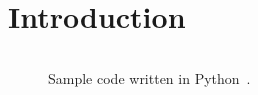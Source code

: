 \section*{Introduction}
\begin{figure}[h]
	\inputminted[linenos]{python}{../python_code/main.py}
	\caption{Sample code written in Python~\cite{rossumPythonLanguageReference2010}.}
\end{figure}
